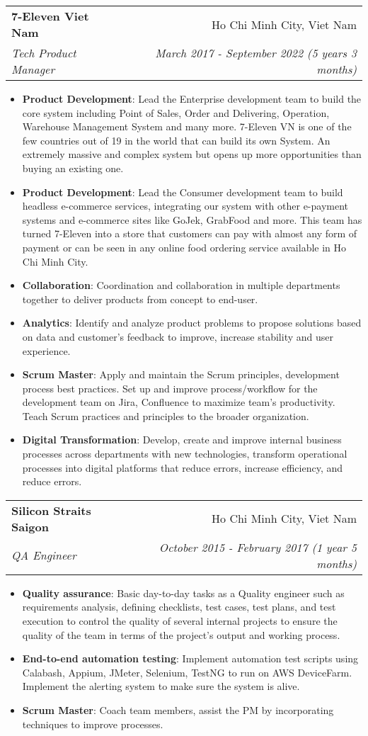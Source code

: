 \documentclass[letterpaper,11pt]{article}
\makeatletter
\newcommand{\resumeItem}[2]{
  \item\small{
    \textbf{#1}{: #2 \vspace{-2pt}}
  }
}
\newcommand{\resumeSubheading}[4]{
  \vspace{-1pt}\item
    \begin{tabular*}{0.97\textwidth}[t]{l@{\extracolsep{\fill}}r}
      \textbf{#1} & #2 \\
      \textit{\small#3} & \textit{\small #4} \\
    \end{tabular*}\vspace{-5pt}
}
\newcommand{\resumeItemListStart}{\begin{itemize}}
\newcommand{\resumeItemListEnd}{\end{itemize}\vspace{-5pt}}
\makeatother
\begin{document}
    \resumeSubheading
      {7-Eleven Viet Nam}{Ho Chi Minh City, Viet Nam}
      {Tech Product Manager}{March 2017 - September 2022 (5 years 3 months)}
      \resumeItemListStart
        \resumeItem{Product Development}
        {Lead the Enterprise development team to build the core system including Point of Sales, Order and Delivering, Operation, Warehouse Management System and many more. 7-Eleven VN is one of the few countries out of 19 in the world that can build its own System. An extremely massive and complex system but opens up more opportunities than buying an existing one.}
        \resumeItem{Product Development}
        {Lead the Consumer development team to build headless e-commerce services, integrating our system with other e-payment systems and e-commerce sites like GoJek, GrabFood and more. This team has turned 7-Eleven into a store that customers can pay with almost any form of payment or can be seen in any online food ordering service available in Ho Chi Minh City.}
        \resumeItem{Collaboration}
        {Coordination and collaboration in multiple departments together to deliver products from concept to end-user.}
        \resumeItem{Analytics}
        {Identify and analyze product problems to propose solutions based on data and customer's feedback to improve, increase stability and user experience.}
        \resumeItem{Scrum Master}
        {Apply and maintain the Scrum principles, development process best practices. Set up and improve process/workflow for the development team on Jira, Confluence to maximize team's productivity. Teach Scrum practices and principles to the broader organization.}
        \resumeItem{Digital Transformation}
        {Develop, create and improve internal business processes across departments with new technologies, transform operational processes into digital platforms that reduce errors, increase efficiency, and reduce errors.}
    \resumeItemListEnd

    \resumeSubheading
      {Silicon Straits Saigon}{Ho Chi Minh City, Viet Nam}
      {QA Engineer}{October 2015 - February 2017 (1 year 5 months)}
      \resumeItemListStart
        \resumeItem{Quality assurance}
            {Basic day-to-day tasks as a Quality engineer such as requirements analysis, defining checklists, test cases, test plans, and test execution to control the quality of several internal projects to ensure the quality of the team in terms of the project's output and working process.}
        \resumeItem{End-to-end automation testing}
            {Implement automation test scripts using Calabash, Appium, JMeter, Selenium, TestNG to run on AWS DeviceFarm. Implement the alerting system to make sure the system is alive.}
        \resumeItem{Scrum Master}
            {Coach team members, assist the PM by incorporating techniques to improve processes.}
      \resumeItemListEnd
\end{document}
